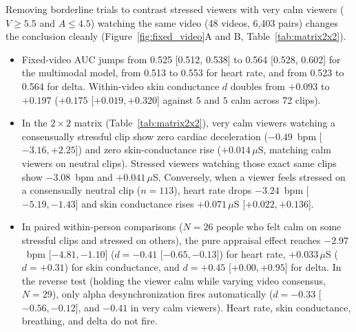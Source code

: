 \documentclass[10pt]{article}
\begin{document}
Removing borderline trials to contrast stressed viewers with very calm viewers ($V \ge 5.5$ and $A \le 4.5$) watching the same video (48 videos, 6,403 pairs) changes the conclusion cleanly (Figure~\ref{fig:fixed_video}A and B, Table~\ref{tab:matrix2x2}).
\begin{itemize}
\item Fixed-video AUC jumps from 0.525 [0.512, 0.538] to 0.564 [0.528, 0.602] for the multimodal model, from 0.513 to 0.553 for heart rate, and from 0.523 to 0.564 for delta. Within-video skin conductance $d$ doubles from $+0.093$ to $+0.197$ ($+0.175$ [$+0.019, +0.320$] against $5$ and $5$ calm across 72 clips).
\item In the $2 \times 2$ matrix (Table~\ref{tab:matrix2x2}), very calm viewers watching a consensually stressful clip show zero cardiac deceleration ($-0.49$~bpm [$-3.16, +2.25$]) and zero skin-conductance rise ($+0.014\,\mu$S, matching calm viewers on neutral clips). Stressed viewers watching those exact same clips show $-3.08$~bpm and $+0.041\,\mu$S. Conversely, when a viewer feels stressed on a consensually neutral clip ($n = 113$), heart rate drops $-3.24$~bpm [$-5.19, -1.43$] and skin conductance rises $+0.071\,\mu$S [$+0.022, +0.136$].
\item In paired within-person comparisons ($N = 26$ people who felt calm on some stressful clips and stressed on others), the pure appraisal effect reaches $-2.97$~bpm [$-4.81, -1.10$] ($d = -0.41$ [$-0.65, -0.13$]) for heart rate, $+0.033\,\mu$S ($d = +0.31$) for skin conductance, and $d = +0.45$ [$+0.00, +0.95$] for delta. In the reverse test (holding the viewer calm while varying video consensus, $N = 29$), only alpha desynchronization fires automatically ($d = -0.33$ [$-0.56, -0.12$], and $-0.41$ in very calm viewers). Heart rate, skin conductance, breathing, and delta do not fire.
\end{itemize}
\end{document}
